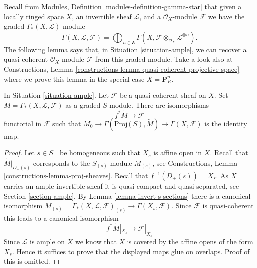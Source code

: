 \noindent
Recall from Modules, Definition \ref{modules-definition-gamma-star}
that given a locally ringed space $X$, an invertible sheaf $\mathcal{L}$,
and a $\mathcal{O}_X$-module $\mathcal{F}$ we have the graded
$\Gamma_*(X, \mathcal{L})$-module
$$
\Gamma(X, \mathcal{L}, \mathcal{F}) =
\bigoplus\nolimits_{n \in \mathbf{Z}}
\Gamma(X, \mathcal{F} \otimes_{\mathcal{O}_X} \mathcal{L}^{\otimes n}).
$$
The following lemma says that, in Situation \ref{situation-ample},
we can recover a quasi-coherent $\mathcal{O}_X$-module $\mathcal{F}$
from this graded module. Take a look also at
Constructions, Lemma \ref{constructions-lemma-quasi-coherent-projective-space}
where we prove this lemma in the special case $X = \mathbf{P}^n_R$.

\begin{lemma}
\label{lemma-ample-quasi-coherent}
In Situation \ref{situation-ample}.
Let $\mathcal{F}$ be a quasi-coherent sheaf on $X$.
Set $M = \Gamma_*(X, \mathcal{L}, \mathcal{F})$ as a graded $S$-module.
There are isomorphisms
$$
f^*\widetilde{M} \longrightarrow \mathcal{F}
$$
functorial in $\mathcal{F}$ such that
$M_0 \to \Gamma(\text{Proj}(S), \widetilde{M}) \to \Gamma(X, \mathcal{F})$
is the identity map.
\end{lemma}

\begin{proof}
Let $s \in S_{+}$ be homogeneous such that $X_s$ is affine open in $X$.
Recall that $\widetilde{M}|_{D_{+}(s)}$ corresponds to the
$S_{(s)}$-module $M_{(s)}$, see
Constructions, Lemma \ref{constructions-lemma-proj-sheaves}.
Recall that $f^{-1}(D_{+}(s)) = X_s$.
As $X$ carries an ample invertible sheaf it is quasi-compact and
quasi-separated, see Section \ref{section-ample}.
By Lemma \ref{lemma-invert-s-sections} there is a canonical isomorphism
$M_{(s)} = \Gamma_*(X, \mathcal{L}, \mathcal{F})_{(s)} \to
\Gamma(X_s, \mathcal{F})$.
Since $\mathcal{F}$ is quasi-coherent this leads to
a canonical isomorphism
$$
f^*\widetilde{M}|_{X_s} \to \mathcal{F}|_{X_s}
$$
Since $\mathcal{L}$ is ample on $X$ we know that $X$ is covered
by the affine opens of the form $X_s$. Hence it suffices to prove
that the displayed maps glue on overlaps. Proof of this is
omitted.
\end{proof}

